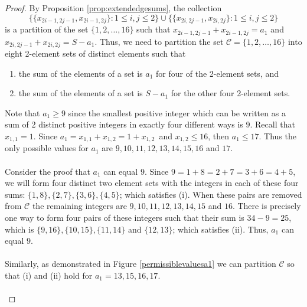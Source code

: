 \documentclass[10pt,a4paper]{amsart}
\begin{document}
\begin{proof}
     By Proposition \ref{prop:extendedgesums},
    the collection
\begin{equation}\label{partition1to16}
    \big\{ \{x_{2i-1,2j-1}, x_{2i-1,2j}\} : 1\le i,j\le 2\big\}
    \cup
     \big\{ \{x_{2i,2j-1}, x_{2i,2j}\} : 1\le i,j\le 2\big\}
\end{equation}
is a partition of the set $\{1,2,\ldots,16\}$ such that
$x_{2i-1,2j-1} + x_{2i-1,2j} = a_1$ and
$x_{2i,2j-1} + x_{2i,2j} =S- a_1$.
Thus, we need to partition the set $\mathcal{C}=\{1,2,\ldots,16\}$ into eight 2-element sets of distinct elements such that
  \begin{enumerate}
    \item[(i)]  the sum of the elements of a set is $a_1$ for four of the 2-element sets, and
    \item[(ii)]  the sum of the elements of a set  is $S-a_1$ for the other four 2-element sets.
  \end{enumerate}
   Note that $a_1\ge 9$ since the smallest positive integer which can be written as a sum of 2 distinct positive integers in exactly four different ways is $9$. Recall that $x_{1,1}=1$. Since $a_1=x_{1,1}+x_{1,2}=1+x_{1,2}$\ and $x_{1,2}\le 16$, then $a_1\le 17$.
  Thus the only possible values for $a_1$ are $9,10,11,12,13,14,15,16$ and $17$.\\
  \hspace{.1in}\\
  Consider the proof that $a_1$ can equal $9$.
  Since $9=1+8=2+7=3+6=4+5$, we will form four distinct two element sets with the integers in each of these four sums: $\{1,8\}, \{2,7\}, \{3, 6\}, \{4,5\}$; which satisfies (i). When these pairs are removed from $\mathcal{C}$ the remaining integers are 
  $9,10,11,12,13,14, 15$ and $16$. There is precisely one way to form four pairs of these integers such that their sum is $34-9=25$, which is $\{9, 16\}, \{10, 15\}, \{11, 14 \}$ and $ \{12, 13\}$; which satisfies (ii). Thus, $a_1$ can equal $9$.\\
  \hspace{2in}\\
  Similarly, as demonstrated in Figure \ref{permissiblevaluesa1} we can partition $\mathcal{C}$ so that (i) and (ii) hold for $a_1=13, 15, 16, 17$.\\
  \hspace{2in}\\


\end{proof}
\end{document}
